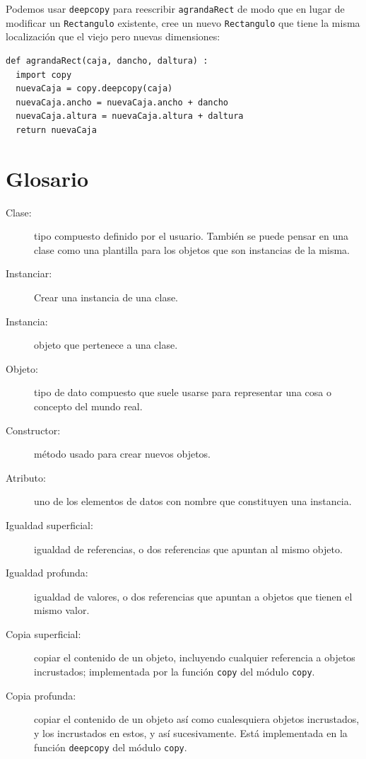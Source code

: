 Podemos usar \texttt{deepcopy} para reescribir \texttt{agrandaRect} de modo que
en lugar de modificar un \texttt{Rectangulo} existente, cree un nuevo
\texttt{Rectangulo} que tiene la misma localización que el viejo pero nuevas
dimensiones:

\beforeverb
\begin{verbatim}
def agrandaRect(caja, dancho, daltura) :
  import copy
  nuevaCaja = copy.deepcopy(caja)
  nuevaCaja.ancho = nuevaCaja.ancho + dancho
  nuevaCaja.altura = nuevaCaja.altura + daltura
  return nuevaCaja
\end{verbatim}
\afterverb
%

\section{Glosario}

\begin{description}

\item[Clase:] tipo compuesto definido por el usuario. También se puede pensar en una
clase como una plantilla para los objetos que son instancias de la misma.

\item[Instanciar:] Crear una instancia de una clase.

\item[Instancia:] objeto que pertenece a una clase.

\item[Objeto:] tipo de dato compuesto que suele usarse para representar
una cosa o concepto del mundo real.

\item[Constructor:] método usado para crear nuevos objetos.

\item[Atributo:] uno de los elementos de datos con nombre que
constituyen una instancia.

\item[Igualdad superficial:] igualdad de referencias, o dos referencias
que apuntan al mismo objeto.

\item[Igualdad profunda:] igualdad de valores, o dos referencias que apuntan
a objetos que tienen el mismo valor.

\item[Copia superficial:] copiar el contenido de un objeto, incluyendo
cualquier referencia a objetos incrustados; implementada por la función \texttt{copy}
del módulo \texttt{copy}.

\item[Copia profunda:] copiar el contenido de un objeto así como cualesquiera
objetos incrustados, y los incrustados en estos, y así sucesivamente. Está implementada 
en la función \texttt{deepcopy} del módulo \texttt{copy}.


\end{description}


